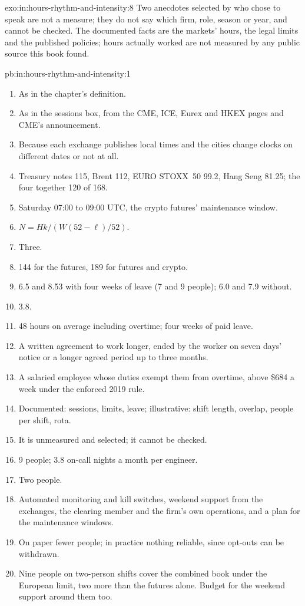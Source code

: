 \begin{solution}{exo:in:hours-rhythm-and-intensity:8}
Two anecdotes selected by who chose to speak are not a measure; they do not say which firm, role, season or year, and
cannot be checked. The documented facts are the markets' hours, the legal limits and the published policies; hours
actually worked are not measured by any public source this book found.
\end{solution}

\begin{solution}{pb:in:hours-rhythm-and-intensity:1}
\begin{enumerate}
\item As in the chapter's definition.
\item As in the sessions box, from the CME, ICE, Eurex and HKEX pages and CME's announcement.
\item Because each exchange publishes local times and the cities change clocks on different dates or not at all.
\item Treasury notes 115, Brent 112, EURO STOXX~50 99.2, Hang Seng 81.25; the four together 120 of 168.
\item Saturday 07:00 to 09:00 UTC, the crypto futures' maintenance window.
\item $N=Hk/(W(52-\ell)/52)$.
\item Three.
\item 144 for the futures, 189 for futures and crypto.
\item 6.5 and 8.53 with four weeks of leave (7 and 9 people); 6.0 and 7.9 without.
\item 3.8.
\item 48 hours on average including overtime; four weeks of paid leave.
\item A written agreement to work longer, ended by the worker on seven days' notice or a longer agreed period up to three
months.
\item A salaried employee whose duties exempt them from overtime, above \$684 a week under the enforced 2019 rule.
\item Documented: sessions, limits, leave; illustrative: shift length, overlap, people per shift, rota.
\item It is unmeasured and selected; it cannot be checked.
\item 9 people; 3.8 on-call nights a month per engineer.
\item Two people.
\item Automated monitoring and kill switches, weekend support from the exchanges, the clearing member and the firm's own
operations, and a plan for the maintenance windows.
\item On paper fewer people; in practice nothing reliable, since opt-outs can be withdrawn.
\item Nine people on two-person shifts cover the combined book under the European limit, two more than the futures alone.
Budget for the weekend support around them too.
\end{enumerate}
\end{solution}

